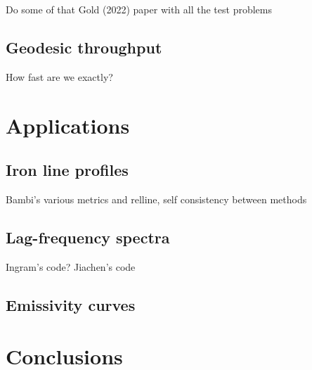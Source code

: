 \documentclass[fleqn,usenatbib]{mnras}
\begin{document}
Do some of that Gold (2022) paper with all the test problems

\subsection{Geodesic throughput}

How fast are we exactly?

\section{Applications}

\subsection{Iron line profiles}

Bambi's various metrics and relline, self consistency between methods

\subsection{Lag-frequency spectra}

Ingram's code? Jiachen's code

\subsection{Emissivity curves}







\section{Conclusions}
\end{document}
